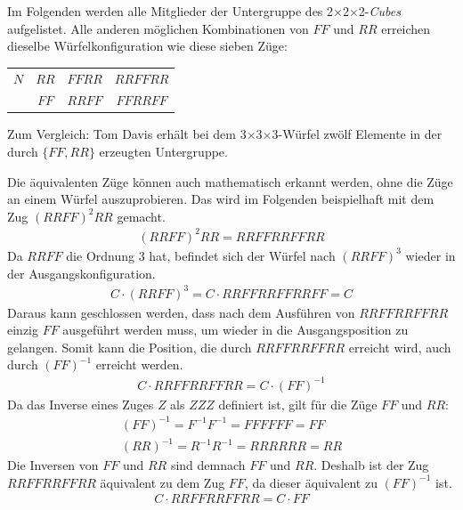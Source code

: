 \documentclass[12pt,a4paper, usenames, dvipsnames]{article}
\theoremstyle{mystyle}
\theoremstyle{definition}
\newcommand{\Ttwo}{2$\times$2$\times$2-}
\newcommand{\Tthree}{3$\times$3$\times$3-}
\begin{document}
Im Folgenden werden alle Mitglieder der Untergruppe des \Ttwo \textit{Cubes} aufgelistet. Alle anderen möglichen Kombinationen von $FF$ und $RR$ erreichen dieselbe Würfelkonfiguration wie diese sieben Züge:
\begin{center}
\centering
\begin{tabular}{c c c c}
$N$ & $RR$ & $FFRR$ &  $RRFFRR$ \\
& $FF$ & $RRFF$ & $FFRRFF$   \\
\end{tabular}
\end{center}
Zum Vergleich: Tom Davis erhält bei dem  \Tthree Würfel zwölf Elemente in der durch $\{ FF, RR \}$ erzeugten Untergruppe.

Die äquivalenten Züge können auch mathematisch erkannt werden, ohne die Züge an einem Würfel auszuprobieren.
Das wird im Folgenden beispielhaft mit dem Zug $(RRFF)^2 RR$ gemacht.
\begin{align*}
(RRFF)^2 RR = RRFFRRFFRR
\end{align*}
Da $RRFF$ die Ordnung 3 hat, befindet sich der Würfel nach $(RRFF)^3$ wieder in der Ausgangskonfiguration.
\begin{align*}
C \cdot (RRFF)^3 = C \cdot RRFFRRFFRRFF = C
\end{align*}
Daraus kann geschlossen werden, dass nach dem Ausführen von $RRFFRRFFRR$ einzig $FF$ ausgeführt werden muss, um wieder in die Ausgangsposition zu gelangen. Somit kann die Position, die durch $RRFFRRFFRR$ erreicht wird, auch durch $(FF)^{-1}$ erreicht werden.
\begin{align*}
C \cdot RRFFRRFFRR = C \cdot (FF)^{-1}
\end{align*}
Da das Inverse eines Zuges $Z$ als $ZZZ$ definiert ist, gilt für die Züge $FF$ und $RR$:
\begin{align*}
(FF)^{-1} = F^{-1}F^{-1} = FFFFFF = FF \\
(RR)^{-1} = R^{-1}R^{-1} = RRRRRR = RR
\end{align*}
Die Inversen von $FF$ und $RR$ sind demnach $FF$ und $RR$. Deshalb ist der Zug $RRFFRRFFRR$ äquivalent zu dem Zug $FF$, da dieser äquivalent zu $(FF)^{-1}$ ist.
\begin{align*}
C \cdot RRFFRRFFRR = C \cdot FF
\end{align*}
\end{document}
